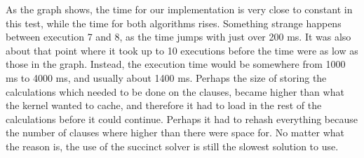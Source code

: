 As the graph shows, the time for our implementation is very close to constant in this test, while the time for both algorithms rises. Something strange happens between execution 7 and 8, as the time jumps with just over 200 ms. It was also about that point where it took up to 10 executions before the time were as low as those in the graph. Instead, the execution time would be somewhere from 1000 ms to 4000 ms, and usually about 1400 ms. Perhaps the size of storing the calculations which needed to be done on the clauses, became higher than what the kernel wanted to cache, and therefore it had to load in the rest of the calculations before it could continue. Perhaps it had to rehash everything because the number of clauses where higher than there were space for. No matter what the reason is, the use of the succinct solver is still the slowest solution to use.

